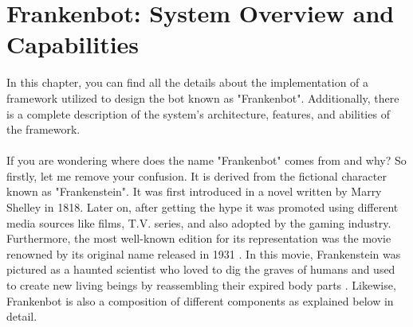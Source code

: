 \chapter{Frankenbot: System Overview and Capabilities \label{cha:chapter3}}
In this chapter, you can find all the details about the implementation of a framework utilized to design the bot known as "Frankenbot". Additionally, there is a complete description of the system's architecture, features, and abilities of the framework. 
\\~\\
If you are wondering where does the name "Frankenbot" comes from and why? So firstly, let me remove your confusion. It is derived from the fictional character known as "Frankenstein". It was first introduced in a novel written by Marry Shelley in 1818. Later on, after getting the hype it was promoted using different media sources like films, T.V. series, and also adopted by the gaming industry. Furthermore, the most well-known edition for its representation was the movie renowned by its original name released in 1931 \cite{frankenstein}. In this movie, Frankenstein was pictured as a haunted scientist who loved to dig the graves of humans and used to create new living beings by reassembling their expired body parts \cite{frankensteinmovie}. Likewise, Frankenbot is also a composition of different components as explained below in detail.

